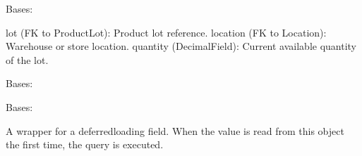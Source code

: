 \documentclass[a4paper,11pt,spanish]{sphinxmanual}
\begin{document}
\begin{fulllineitems}
\label{\detokenize{api/inventory/inventory.models:inventory.models.LotStock}}
\pysigstartsignatures
\pysiglinewithargsret
{}
{\sphinxparamcomma {}}
{}
\pysigstopsignatures
\sphinxAtStartPar
Bases: 
\begin{description}
\sphinxAtStartPar
lot (FK to ProductLot): Product lot reference.
location (FK to Location): Warehouse or store location.
quantity (DecimalField): Current available quantity of the lot.

\end{description}

\begin{fulllineitems}
\label{\detokenize{api/inventory/inventory.models:inventory.models.LotStock.DoesNotExist}}
\pysigstartsignatures
\pysigline
{}
\pysigstopsignatures
\sphinxAtStartPar
Bases: 

\end{fulllineitems}


\begin{fulllineitems}
\label{\detokenize{api/inventory/inventory.models:inventory.models.LotStock.MultipleObjectsReturned}}
\pysigstartsignatures
\pysigline
{}
\pysigstopsignatures
\sphinxAtStartPar
Bases: 

\end{fulllineitems}


\begin{fulllineitems}
\label{\detokenize{api/inventory/inventory.models:inventory.models.LotStock.id_lot_stock}}
\pysigstartsignatures
\pysigline
{}
\pysigstopsignatures
\sphinxAtStartPar
A wrapper for a deferred\sphinxhyphen{}loading field. When the value is read from this
object the first time, the query is executed.


\end{fulllineitems}
\end{fulllineitems}
\end{document}
